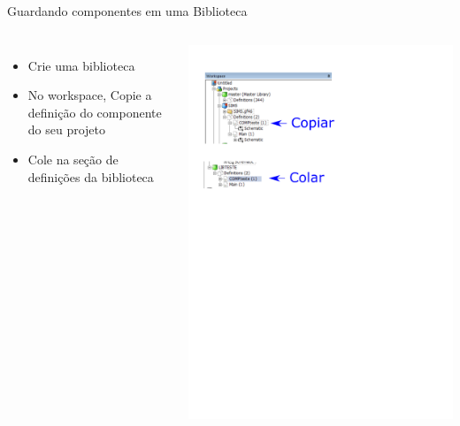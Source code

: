 \begin{frame}{Guardando componentes em uma Biblioteca}
\centering

\begin{columns}



\begin{itemize}
\item Crie uma biblioteca
\vspace*{1cm}
\item No workspace, Copie a definição do componente do seu projeto
\vspace*{1cm}
\item Cole na seção de definições da biblioteca
\end{itemize}
\vspace*{1cm}

\centering
\vspace*{1cm}

\includegraphics[width=0.75\linewidth]{./figuras/Componentes/lib}


\end{columns}

\end{frame}